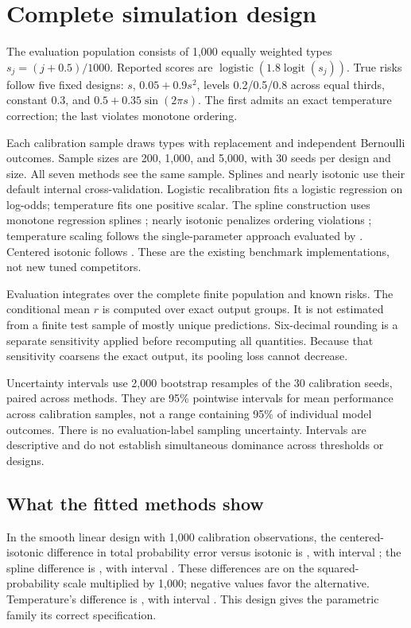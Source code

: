 \documentclass[11pt]{article}
\begin{document}
\clearpage
\section{Complete simulation design}
The evaluation population consists of 1,000 equally weighted types $s_j=(j+0.5)/1000$. Reported scores are $\operatorname{logistic}(1.8\operatorname{logit}(s_j))$. True risks follow five fixed designs: $s$, $0.05+0.9s^2$, levels 0.2/0.5/0.8 across equal thirds, constant 0.3, and $0.5+0.35\sin(2\pi s)$. The first admits an exact temperature correction; the last violates monotone ordering.

Each calibration sample draws types with replacement and independent Bernoulli outcomes. Sample sizes are 200, 1,000, and 5,000, with 30 seeds per design and size. All seven methods see the same sample. Splines and nearly isotonic use their default internal cross-validation. Logistic recalibration fits a logistic regression on log-odds; temperature fits one positive scalar. The spline construction uses monotone regression splines \citep{ramsay1988monotone}; nearly isotonic penalizes ordering violations \citep{tibshirani2011nearly}; temperature scaling follows the single-parameter approach evaluated by \citet{guo2017}. Centered isotonic follows \citet{oron2017centered}. These are the existing benchmark implementations, not new tuned competitors.

Evaluation integrates over the complete finite population and known risks. The conditional mean $r$ is computed over exact output groups. It is not estimated from a finite test sample of mostly unique predictions. Six-decimal rounding is a separate sensitivity applied before recomputing all quantities. Because that sensitivity coarsens the exact output, its pooling loss cannot decrease.

Uncertainty intervals use 2,000 bootstrap resamples of the 30 calibration seeds, paired across methods. They are 95\% pointwise intervals for mean performance across calibration samples, not a range containing 95\% of individual model outcomes. There is no evaluation-label sampling uncertainty. Intervals are descriptive and do not establish simultaneous dominance across thresholds or designs.

\subsection{What the fitted methods show}
In the smooth linear design with 1,000 calibration observations, the centered-isotonic difference in total probability error versus isotonic is \CenteredDifference{}, with interval \CenteredInterval{}; the spline difference is \SplineDifference{}, with interval \SplineInterval{}. These differences are on the squared-probability scale multiplied by 1,000; negative values favor the alternative. Temperature's difference is \TemperatureDifference{}, with interval \TemperatureInterval{}. This design gives the parametric family its correct specification.
\end{document}
